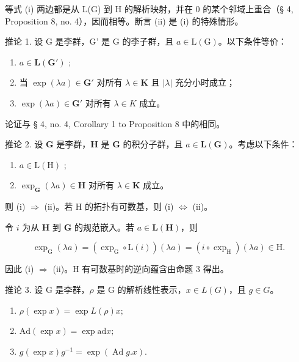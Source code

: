 等式 (i) 两边都是从 L(G) 到 H 的解析映射，并在 0 的某个邻域上重合（§ 4, Proposition 8, no. 4），因而相等。断言 (ii) 是 (i) 的特殊情形。

推论 1. 设 G 是李群，G' 是 G 的李子群，且 \(a \in \mathrm{L}(\mathrm{G})\)。以下条件等价：

\begin{enumerate}
\def\labelenumi{(\roman{enumi})}
\item
  \(a \in \mathbf{L}(\mathbf{G}')\) ;
\item
  当 \(\exp (\lambda a)\in \mathbf{G}'\) 对所有 \(\lambda \in \mathbf{K}\) 且 \(|\lambda |\) 充分小时成立；
\item
  \(\exp(\lambda a) \in \mathbf{G}'\) 对所有 \(\lambda \in K\) 成立。
\end{enumerate}

论证与 § 4, no. 4, Corollary 1 to Proposition 8 中的相同。

推论 2. 设 \(\mathbf{G}\) 是李群，\(\mathbf{H}\) 是 \(\mathbf{G}\) 的积分子群，且 \(a \in \mathbf{L}(\mathbf{G})\)。考虑以下条件：

\begin{enumerate}
\def\labelenumi{(\roman{enumi})}
\item
  \(a \in \mathrm{L}(\mathrm{H})\) ;
\item
  \(\exp_{\mathbf{G}}(\lambda a)\in \mathbf{H}\) 对所有 \(\lambda \in \mathbf{K}\) 成立。
\end{enumerate}

则 (i) \(\Rightarrow\) (ii)。若 H 的拓扑有可数基，则 (i) \(\Leftrightarrow\) (ii)。

令 \(i\) 为从 \(\mathbf{H}\) 到 \(\mathbf{G}\) 的规范嵌入。若 \(a \in \mathbf{L}(\mathbf{H})\)，则

\[
\exp_ {\mathrm{G}} (\lambda a) = \left(\exp_ {\mathrm{G}} \circ \mathrm{L} (i)\right) (\lambda a) = (i \circ \exp_ {\mathrm{H}}) (\lambda a) \in \mathrm{H}.
\]

因此 (i) \(\Rightarrow\) (ii)。H 有可数基时的逆向蕴含由命题 3 得出。

推论 3. 设 G 是李群，\(\rho\) 是 G 的解析线性表示，\(x \in L(G)\)，且 \(g \in G\)。

\begin{enumerate}
\def\labelenumi{(\roman{enumi})}
\item
  \(\rho(\exp x) = \exp L(\rho)x;\)
\item
  \(\mathrm{Ad}(\exp x) = \exp \mathrm{ad} x;\)
\item
  \(g(\exp x)g^{-1} = \exp(\operatorname{Ad} g.x).\)
\end{enumerate}

